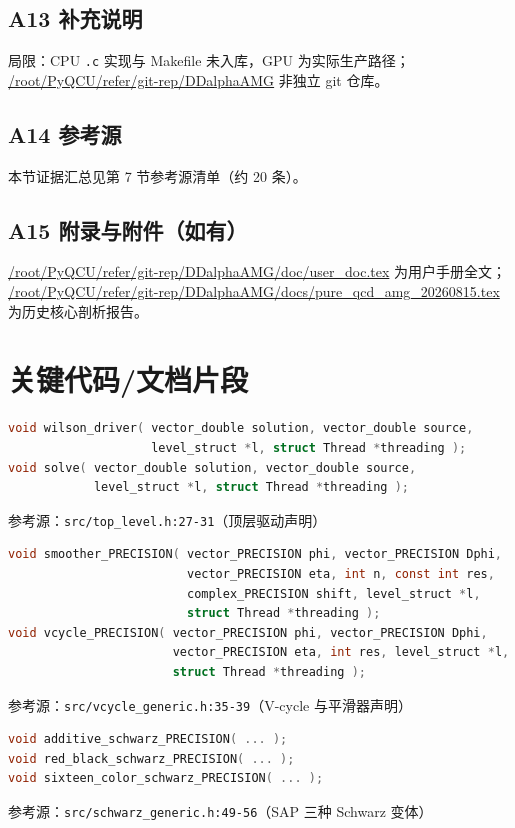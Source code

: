 \documentclass[UTF8]{ctexart}
\begin{document}
\subsection{A13 补充说明}
\textcolor{warn}{局限：}CPU \texttt{.c} 实现与 Makefile 未入库，GPU 为实际生产路径；
\url{/root/PyQCU/refer/git-rep/DDalphaAMG} 非独立 git 仓库。

\subsection{A14 参考源}
本节证据汇总见第 7 节参考源清单（约 20 条）。

\subsection{A15 附录与附件（如有）}
\url{/root/PyQCU/refer/git-rep/DDalphaAMG/doc/user_doc.tex} 为用户手册全文；
\url{/root/PyQCU/refer/git-rep/DDalphaAMG/docs/pure_qcd_amg_20260815.tex} 为历史核心剖析报告。

\section{关键代码/文档片段}

\begin{lstlisting}[language=C]
void wilson_driver( vector_double solution, vector_double source,
                    level_struct *l, struct Thread *threading );
void solve( vector_double solution, vector_double source,
            level_struct *l, struct Thread *threading );
\end{lstlisting}
参考源：\texttt{src/top\_level.h:27-31}（顶层驱动声明）

\begin{lstlisting}[language=C]
void smoother_PRECISION( vector_PRECISION phi, vector_PRECISION Dphi,
                         vector_PRECISION eta, int n, const int res,
                         complex_PRECISION shift, level_struct *l,
                         struct Thread *threading );
void vcycle_PRECISION( vector_PRECISION phi, vector_PRECISION Dphi,
                       vector_PRECISION eta, int res, level_struct *l,
                       struct Thread *threading );
\end{lstlisting}
参考源：\texttt{src/vcycle\_generic.h:35-39}（V-cycle 与平滑器声明）

\begin{lstlisting}[language=C]
void additive_schwarz_PRECISION( ... );
void red_black_schwarz_PRECISION( ... );
void sixteen_color_schwarz_PRECISION( ... );
\end{lstlisting}
参考源：\texttt{src/schwarz\_generic.h:49-56}（SAP 三种 Schwarz 变体）
\end{document}
